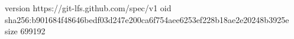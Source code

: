 version https://git-lfs.github.com/spec/v1
oid sha256:b901684f48646bedf03d247e200ca6f754aee6253ef228b18ae2e20248b3925e
size 699192
